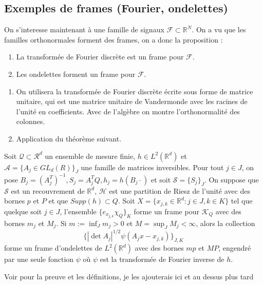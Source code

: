 \subsection{Exemples de frames (Fourier, ondelettes)}
On s'interesse maintenant à une famille de signaux $\mathcal{F} \subset \mathbb{R}^N$.
On a vu que les familles orthonormales forment des frames, on a donc la proposition :
\begin{proposition}
	\begin{enumerate}
		\item La transformée de Fourier discrète est un frame pour $\mathcal{F}$.
		\item Les ondelettes forment un frame pour $\mathcal{F}$.
	\end{enumerate}
\end{proposition}
\begin{preuve}
	\begin{enumerate}
		\item On utilisera la transformée de Fourier discrète écrite sous forme de matrice unitaire, qui est une matrice unitaire de Vandermonde avec les racines de l'unité en coefficients. Avec de l'algèbre on montre l'orthonormalité des colonnes.
		\item Application du théorème suivant.
	\end{enumerate}
\end{preuve}

\begin{theoreme}
	Soit $\mathcal{Q} \subset \mathcal{R}^d$ un ensemble de mesure finie, $h \in L^2(\mathbb{R}^d)$
	et $\mathcal{A} =\{A_j \in GL_d(R)\}_J$ une famille de matrices inversibles.
	\newline
	Pour tout $j \in J$, on pose $B_j =(A_j^T)^{-1}, S_j = A_j^TQ, h_j = h(B_j \cdot)$
	et soit $\mathcal{S} = \{S_j\}_J$.
	\newline
	On suppose que $\mathcal{S}$ est un recouvrement de $\mathbb{R}^d$, $\mathcal{H}$ est une partition de Riesz de l'unité avec des bornes $p$ et $P$ et que $Supp(h) \subset Q$.
	\newline
	Soit $X = \{x_{j,k} \in \mathbb{R}^d : j\in J, k \in K\}$ tel que quelque soit $j \in J$, 
	l'ensemble $\{e_{x_{j,k}}\chi_Q\}_K$ forme un frame pour $\mathcal{K}_Q$ avec des bornes $m_j$ et $M_j$. 
	\newline
	Si $m := \inf_J m_j > 0$ et $M= \sup_J M_j < \infty$, alors la collection
	\begin{equation*}
		\{|\det A_j|^{1/2} \psi(A_j x - x_{j,k})\}_{J, K}
	\end{equation*}
	forme un frame d'ondelettes de $L^2(\mathbb{R}^d)$ avec des bornes $mp$ et $MP$, 
	engendré par une seule fonction $\psi$ où $\psi$ est la transformée de Fourier inverse de $h$.
\end{theoreme}
\begin{preuve}
	Voir \cite{IrregWav} pour la preuve et les définitions, je les ajouterais ici et au dessus plus tard %
\end{preuve}

